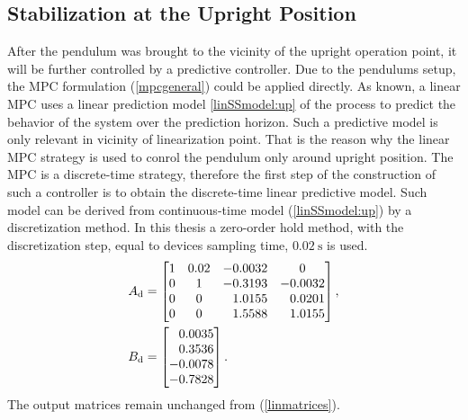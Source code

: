 \subsection{Stabilization at the Upright Position}
After the pendulum was brought to the vicinity of the upright operation point, it will be further controlled by a predictive controller. Due to the pendulums setup, the MPC formulation (\ref{mpcgeneral}) could be applied directly. As known, a linear MPC uses a linear prediction model \ref{linSSmodel:up} of the process to predict the behavior of the system over the prediction horizon. Such a predictive model is only relevant in vicinity of linearization point. That is the reason why the linear MPC strategy is used to conrol the pendulum only around upright position. 
The MPC is a discrete-time strategy, therefore the first step of the construction of such a controller is to obtain the discrete-time linear predictive model. Such model can be derived from continuous-time model (\ref{linSSmodel:up}) by a discretization method. In this thesis a zero-order hold method, with the discretization step, equal to devices sampling time, $\SI{0.02}{\second}$ is used. 
\begin{subequations}\label{dismatrices}
	\begin{align}
	A _{\text{d}} &=\begin{bmatrix}
	1&0.02&-0.0032& 0\\
	0&1&-0.3193&-0.0032\\
	0&0&\ \; \,1.0155&\ \; \,0.0201\\
	0&0&\ \; \,1.5588&\ \; \,1.0155
	\end{bmatrix},\\
	B _{\text{d}} &=\begin{bmatrix}
	\ \; \,0.0035\\
	\ \; \,0.3536\\
	-0.0078\\
	-0.7828
	\end{bmatrix}.
	\end{align}
\end{subequations}
The output matrices remain unchanged from (\ref{linmatrices}).\\ 

